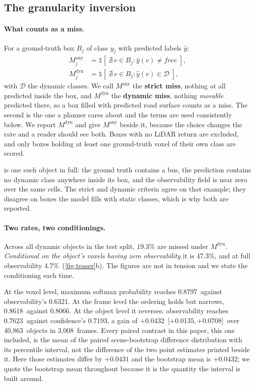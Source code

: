 \documentclass[10pt,twocolumn,letterpaper]{article}
\newcommand{\objObs}{0.7623}
\newcommand{\objMSP}{0.7193}
\newcommand{\objDelta}{+0.0432}
\newcommand{\objDeltaCI}{[+0.0135,\,+0.0708]}
\newcommand{\voxMSP}{0.8797}
\newcommand{\voxObs}{0.6321}
\newcommand{\frmConf}{0.8618}
\newcommand{\frmObs}{0.8066}
\newcommand{\missHi}{47.3\%}
\newcommand{\missLo}{4.7\%}
\newcommand{\nObj}{40{,}863}
\newcommand{\nFrames}{3{,}008}
\begin{document}
\subsection{The granularity inversion}
\label{sec:inversion}

\paragraph{What counts as a miss.} For a ground-truth box $B_j$ of class
$y_j$ with predicted labels $\hat{y}$:
\begin{align}
M_j^{\text{any}} &= \mathbb{1}\!\left[\;\nexists\, v \in B_j :
   \hat{y}(v) \neq \textit{free}\;\right], \label{eq:missany}\\
M_j^{\text{dyn}} &= \mathbb{1}\!\left[\;\nexists\, v \in B_j :
   \hat{y}(v) \in \mathcal{D}\;\right], \label{eq:missdyn}
\end{align}
with $\mathcal{D}$ the dynamic classes. We call $M^{\text{any}}$ the \textbf{strict miss}, nothing at all
predicted inside the box, and $M^{\text{dyn}}$ the \textbf{dynamic miss},
nothing \emph{movable} predicted there, so a box filled with predicted road
surface counts as a miss. The second is the one a planner cares about and
the terms are used consistently below. We report
$M^{\text{dyn}}$ and give $M^{\text{any}}$ beside it, because the choice
changes the rate and a reader should see both. Boxes with no LiDAR return
are excluded, and only boxes holding at least one ground-truth voxel of
their own class are scored.

 is one such object in full: the ground truth
contains a bus, the prediction contains no dynamic class anywhere inside
its box, and the observability field is near zero over the same cells. The strict and
dynamic criteria agree on that example; they disagree on boxes the model
fills with static classes, which is why both are reported.

\paragraph{Two rates, two conditionings.} Across all dynamic objects in the
test split, $19.3\%$ are missed under $M^{\text{dyn}}$. \emph{Conditional on
the object's voxels having zero observability} it is \missHi, and at full
observability \missLo\ (\cref{fig:teaser}b). The figures are not in tension
and we state the conditioning each time.

At the voxel level, maximum softmax probability reaches \voxMSP\ against
observability's \voxObs. At the frame level the ordering holds but
narrows, \frmConf\ against \frmObs. At the object level it reverses:
observability reaches \objObs\ against confidence's \objMSP, a gain of
\objDelta\ \objDeltaCI\ over \nObj\ objects in \nFrames\ frames.
Every paired contrast in this paper, this one included, is the mean of the
paired scene-bootstrap difference distribution with its percentile interval,
not the difference of the two point estimates printed beside it. Here those
estimates differ by $+0.0431$ and the bootstrap mean is $+0.0432$; we quote
the bootstrap mean throughout because it is the quantity the interval is
built around.
\end{document}
